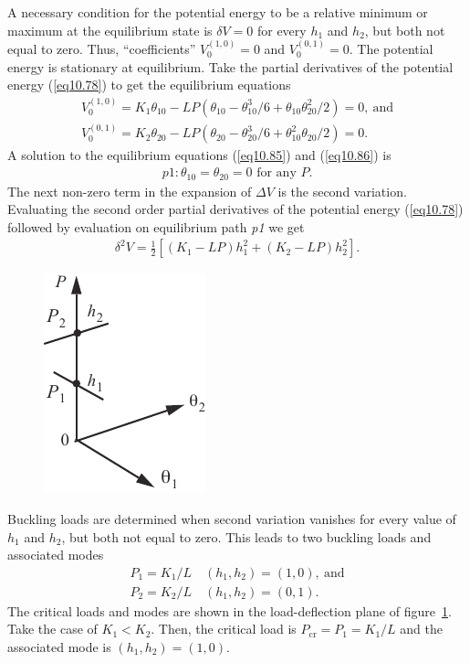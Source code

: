 \documentclass{AeroStructure-ERJohnson}
\begin{document}
\vspace*{-1pc}

A necessary condition for the potential energy to be a relative minimum or maximum at the equilibrium state is $\delta V=0$ for every $h_1$ and $h_2$, but both not equal to zero. Thus, ``coefficients'' $V_{0}^{(1,0)}=0$ and $V_{0}^{(0,1)}=0$. The potential energy is stationary at equilibrium. Take the partial derivatives of the potential energy (\ref{eq10.78}) to get the equilibrium equations
\begin{align}\label{eq10.85}
V_{0}^{(1,0)}=K_{1} \theta_{10}-L P(\theta_{10}-\theta_{10}^{3} / 6+\theta_{10} \theta_{20}^{2} / 2)=0,\ \text{and}
\\
\label{eq10.86}
V_{0}^{(0,1)}=K_{2} \theta_{20}-L P(\theta_{20}-\theta_{20}^{3} / 6+\theta_{10}^{2} \theta_{20} / 2)=0.
\end{align}
A solution to the equilibrium equations (\ref{eq10.85}) and (\ref{eq10.86}) is
\begin{align}\label{eq10.87}
p 1: \theta_{10}=\theta_{20}=0 \text { for any } P.
\end{align}
The next non-zero term in the expansion of $\Delta V$ is the second variation. Evaluating the second order partial derivatives of the potential energy (\ref{eq10.78}) followed by evaluation on equilibrium path \textit{p1} we get
\begin{align}\label{eq10.88}
\delta^{2} V=\frac{1}{2}\left[\left(K_{1}-L P\right) h_{1}^{2}+\left(K_{2}-L P\right) h_{2}^{2}\right].
\end{align}
\begin{figure}
\includegraphics{Figure_10-27.pdf}
\caption{\label{fig10.27}}
\end{figure}

\vspace*{-1.5pc}

\noindent  Buckling loads are determined when second variation vanishes for every value of $h_1$ and $h_2$, but both not equal to zero. This leads to two buckling loads and associated modes
\begin{align}\label{eq10.89}
P_{1}=K_{1} / L \quad\left(h_{1}, h_{2}\right)=(1,0),\ \text{and}\\
\label{eq10.90}
P_{2}=K_{2} / L \quad\left(h_{1}, h_{2}\right)=(0,1).
\end{align}
The critical loads and modes are shown in the load-deflection plane of figure~\ref{fig10.27}. Take the case of $K_{1}<K_{2}$. Then, the critical load is $P_{\mathrm{cr}}=P_{1}=K_{1} / L$ and the associated mode is $\left(h_{1}, h_{2}\right)=(1,0)$.
\end{document}
